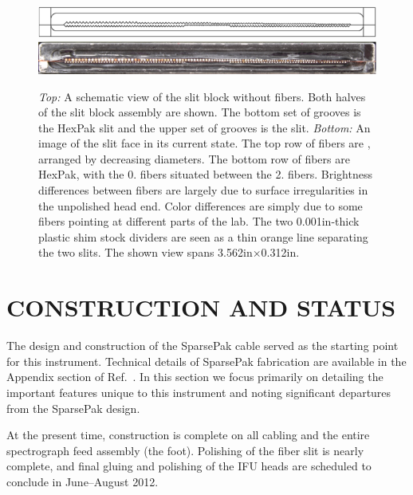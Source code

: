 \begin{figure}[t]
    \centering
    \includegraphics[width=\textwidth]{Pak_build/figs/slit}\\
    \vspace{2pt}
    \includegraphics[width=\textwidth]{Pak_build/figs/slit_img}
    \caption[HexPak/\GP slit]{\fixspacing \emph{Top:} A schematic view of the
      slit block without fibers.  Both halves of the slit block assembly are
      shown.  The bottom set of grooves is the HexPak slit and the upper set
      of grooves is the \GP slit.  \emph{Bottom:} An image of the slit
      face in its current state.  The top row of fibers are \GP, arranged
      by decreasing diameters.  The bottom row of fibers are HexPak, with the
      0. fibers situated between the 2. fibers.  Brightness
      differences between fibers are largely due to surface irregularities in
      the unpolished head end.  Color differences are simply due to some
      fibers pointing at different parts of the lab.  The two 0.001in-thick
      plastic shim stock dividers are seen as a thin orange line separating
      the two slits.  The shown view spans 3.562in$\times$0.312in.
    \label{fig:slit}}
\end{figure}


\section{CONSTRUCTION AND STATUS} 
\label{GPB:sec:construction}

The design and construction of the SparsePak cable served as the starting
point for this instrument.  Technical details of SparsePak fabrication are
available in the Appendix section of Ref.~.  In this
section we focus primarily on detailing the important features unique to this
instrument and noting significant departures from the SparsePak design.


At the present time, construction is complete on all cabling and the entire
spectrograph feed assembly (the foot).  Polishing of the fiber slit is nearly
complete, and final gluing and polishing of the IFU heads are scheduled to
conclude in June--August 2012.

